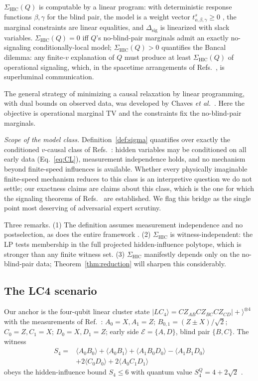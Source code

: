 \documentclass[10pt,twocolumn]{article}
\newcommand{\Sig}{\Sigma_{\mathrm{HIC}}}
\newcommand{\Dsig}{\Delta_{\mathrm{sig}}}
\begin{document}
$\Sig(Q)$ is computable by a linear program: with deterministic response functions $\beta,\gamma$ for the blind pair, the model is a weight vector $t^{s}_{o,\beta,\gamma}\ge0$ \cite{Li2026}, the marginal constraints are linear equalities, and $\Dsig$ is linearized with slack variables. $\Sig(Q)=0$ iff $Q$'s no-blind-pair marginals admit an exactly no-signaling conditionally-local model; $\Sig(Q)>0$ quantifies the Bancal dilemma: any finite-$v$ explanation of $Q$ must produce at least $\Sig(Q)$ of operational signaling, which, in the spacetime arrangements of Refs.~\cite{Bancal2012,Barnea2013,Scarani2014}, is superluminal communication.

The general strategy of minimizing a causal relaxation by linear programming,
with dual bounds on observed data, was developed by Chaves \emph{et al.}~\cite{Chaves2015}.
Here the objective is operational marginal TV and the constraints fix the
no-blind-pair marginals.

\emph{Scope of the model class.} Definition~\ref{def:sigma} quantifies over exactly the conditioned $v$-causal class of Refs.~\cite{Bancal2012,Barnea2013,Li2026}: hidden variables may be conditioned on all early data (Eq.~\eqref{eq:CL}), measurement independence holds, and no mechanism beyond finite-speed influences is available. Whether every physically imaginable finite-speed mechanism reduces to this class is an interpretive question we do not settle; our exactness claims are claims about this class, which is the one for which the signaling theorems of Refs.~\cite{Bancal2012,Scarani2014} are established. We flag this bridge as the single point most deserving of adversarial expert scrutiny.

Three remarks. (1) The definition assumes measurement independence and no postselection, as does the entire framework \cite{Li2026}. (2) $\Sig$ is witness-independent: the LP tests membership in the full projected hidden-influence polytope, which is stronger than any finite witness set. (3) $\Sig$ manifestly depends only on the no-blind-pair data; Theorem~\ref{thm:reduction} will sharpen this considerably.

\subsection{The LC4 scenario}

Our anchor is the four-qubit linear cluster state $|LC_4\rangle = CZ_{AB}CZ_{BC}CZ_{CD}|+\rangle^{\otimes4}$ with the measurements of Ref.~\cite{Li2026}: $A_0{=}X, A_1{=}Z$; $B_{0,1}=(Z{\pm}X)/\sqrt2$; $C_0{=}Z, C_1{=}X$; $D_0{=}X, D_1{=}Z$; early side $\mathcal E=\{A,D\}$, blind pair $\{B,C\}$. The witness
\begin{align}
S_4 = {}& \langle A_0B_0\rangle + \langle A_0B_1\rangle + \langle A_1B_0D_0\rangle - \langle A_1B_1D_0\rangle \nonumber\\
& + 2\langle C_0D_0\rangle + 2\langle A_0C_1D_1\rangle
\label{eq:S4}
\end{align}
obeys the hidden-influence bound $S_4\le6$ with quantum value $S_4^Q = 4+2\sqrt2$ \cite{Li2026}.
\end{document}
